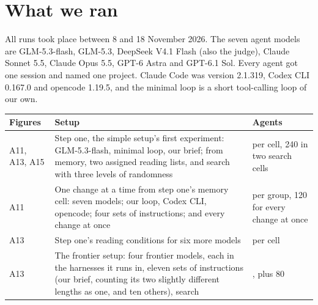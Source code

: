\documentclass[11pt]{article}
\newcounter{none}
\begin{document}


\clearpage
\appendix
\renewcommand{\thefigure}{A\arabic{figure}}\setcounter{figure}{0}

\section{What we ran}\label{appendix-what-we-ran}

All runs took place between 8 and 18 November 2026. The seven agent
models are GLM-5.3-flash, GLM-5.3, DeepSeek V4.1 Flash (also the judge),
Claude Sonnet 5.5, Claude Opus 5.5, GPT-6 Astra and GPT-6.1 Sol. Every
agent got one session and named one project. Claude Code was version
2.1.319, Codex CLI 0.167.0 and opencode 1.19.5, and the minimal loop is
a short tool-calling loop of our own.

{\def\LTcaptype{none} %
\begin{longtable}[]{@{}
  >{\raggedright\arraybackslash}p{}
  >{\raggedright\arraybackslash}p{}
  >{\raggedright\arraybackslash}p{}@{}}
\toprule\noalign{}
\begin{minipage}[b]{\linewidth}\raggedright
Figures
\end{minipage} & \begin{minipage}[b]{\linewidth}\raggedright
Setup
\end{minipage} & \begin{minipage}[b]{\linewidth}\raggedright
Agents
\end{minipage} \\
\midrule\noalign{}
\endhead
\bottomrule\noalign{}
\endlastfoot
A11, A13, A15 & Step one, the simple setup's first experiment:
GLM-5.3-flash, minimal loop, our brief; from memory, two assigned
reading lists, and search with three levels of randomness & 120 per
cell, 240 in two search cells \\
A11 & One change at a time from step one's memory cell: seven models;
our loop, Codex CLI, opencode; four sets of instructions; and every
change at once & 40 per group, 120 for every change at once \\
A13 & Step one's reading conditions for six more models & 40 per cell \\
A13 & The frontier setup: four frontier models, each in the harnesses it
runs in, eleven sets of instructions (our brief, counting its two
slightly different lengths as one, and ten others), search & 80, plus 80

\end{longtable}}
\end{document}
